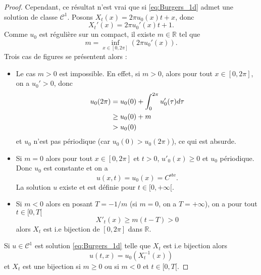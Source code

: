 \begin{proof}
Cependant, ce résultat n'est vrai que si \eqref{eq:Burgers_1d} admet une solution de classe $\mathcal{C}^1$.
Posons $X_t(x) = 2 \pi u_0(x)t + x$, donc
\begin{equation}
X_t'(x) = 2 \pi u_0'(x) t + 1.
\end{equation}
Comme $u_0$ est régulière sur un compact, il existe $m \in \mathbb{R}$ tel que
\begin{equation}
m = \inf_{x \in [0, 2 \pi]} \left( 2 \pi u_0'(x) \right).
\end{equation}
Trois cas de figures se présentent alors :
\begin{itemize}
\item Le cas $m > 0$ est impossible. En effet, si $m>0$, alors pour tout $x \in [0, 2\pi]$, on a $u_0' >0$, donc
\begin{align*}
u_0(2 \pi) & = u_0(0) + \displaystyle\int_0^{2 \pi} u_0'(\tau) d \tau \\
	& \geq u_0(0) + m \\
	& > u_0(0)
\end{align*}
et $u_0$ n'est pas périodique (car $u_0(0)>u_0(2 \pi)$), ce qui est absurde.

\item Si $m=0$ alors pour tout $x \in [0, 2 \pi]$ et $t>0$, $u'_0(x) \geq 0$ et $u_0$ périodique. Donc $u_0$ est constante et on a
\begin{equation}
u(x,t) = u_0(x) = C^{\text{ste}}.
\end{equation}
La solution $u$ existe et est définie pour $t \in [0 , + \infty[$.

\item Si $m < 0$ alors en posant $T = -1/m$ (si $m=0$, on a $T = + \infty$), on a pour tout $t \in [0, T[$
\begin{equation}
X'_t(x) \geq m(t-T) > 0
\end{equation}
alors $X_t$ est i.e bijection de $[0, 2 \pi]$ dans $\mathbb{R}$.
\end{itemize}

Si $u \in \mathcal{C}^1$ est solution \eqref{eq:Burgers_1d} telle que $X_t$ est i.e bijection alors
\begin{equation}
u(t,x) = u_0(X_t^{-1}(x))
\end{equation}
et $X_t$ est une bijection si $m \geq 0$ ou si $m<0$ et $t \in [0, T[$.


\end{proof}

